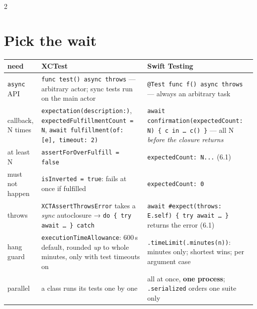 \documentclass[8pt]{extarticle}
\newcommand\ct[1]{\texttt{#1}}
\begin{document}
\begin{multicols}{2}
\raggedright
\footnotesize{}

\section{Pick the wait}
{\scriptsize\setlength{\tabcolsep}{2pt}
\begin{tabular}{@{}>{\raggedright\arraybackslash}p{11mm}>{\raggedright\arraybackslash}p{32mm}>{\raggedright\arraybackslash}p{33mm}@{}}
\toprule
\textbf{need} & \textbf{XCTest} & \textbf{Swift Testing}\\
\midrule
\ct{async} API & \ct{func test() async throws} — arbitrary actor; sync tests run on the main actor & \ct{@Test func f() async throws} — always an arbitrary task\\
callback, N times & \ct{expectation(description:)}, \ct{expectedFulfillmentCount = N}, \ct{await fulfillment(of: [e], timeout: 2)} & \ct{await confirmation(expectedCount: N) \{ c in … c() \}} — all N \emph{before the closure returns}\\
at least N & \ct{assertForOverFulfill = false} & \ct{expectedCount: N...} (6.1)\\
must not happen & \ct{isInverted = true}: fails at once if fulfilled & \ct{expectedCount: 0}\\
throws & \ct{XCTAssertThrowsError} takes a \emph{sync} autoclosure → \ct{do \{ try await … \} catch} & \ct{await \#expect(throws: E.self) \{ try await … \}} returns the error (6.1)\\
hang guard & \ct{executionTimeAllowance}: 600\,s default, rounded \emph{up} to whole minutes, only with test timeouts on & \ct{.timeLimit(.minutes(n))}: minutes only; shortest wins; per argument case\\
parallel & a class runs its tests one by one & all at once, \textbf{one process}; \ct{.serialized} orders one suite only\\
\bottomrule
\end{tabular}}


\end{multicols}
\end{document}
